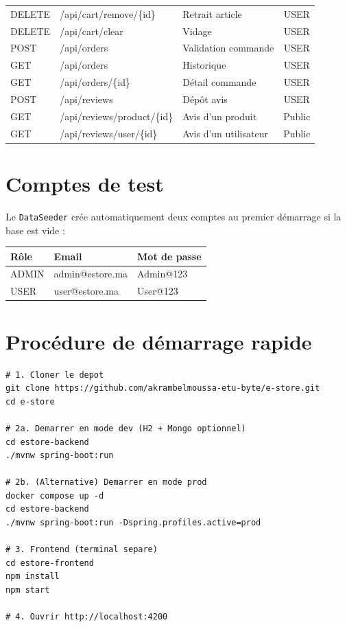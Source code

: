 \documentclass[11pt,a4paper,oneside]{report}
\begin{document}
\begin{longtable}{p{1.2cm}p{4.5cm}p{6cm}c}
DELETE & /api/cart/remove/\{id\}& Retrait article              & USER \\
DELETE & /api/cart/clear        & Vidage                       & USER \\
POST   & /api/orders            & Validation commande          & USER \\
GET    & /api/orders            & Historique                   & USER \\
GET    & /api/orders/\{id\}     & Détail commande              & USER \\
POST   & /api/reviews           & Dépôt avis                   & USER \\
GET    & /api/reviews/product/\{id\} & Avis d'un produit        & Public \\
GET    & /api/reviews/user/\{id\} & Avis d'un utilisateur       & Public \\
\bottomrule
\end{longtable}

\chapter{Comptes de test}

Le \texttt{DataSeeder} crée automatiquement deux comptes au premier
démarrage si la base est vide :

\begin{table}[htbp]
\centering
\small
\begin{tabular}{lll}
\toprule
\textbf{Rôle} & \textbf{Email} & \textbf{Mot de passe}\\
\midrule
ADMIN & admin@estore.ma & Admin@123 \\
USER  & user@estore.ma  & User@123  \\
\bottomrule
\end{tabular}
\end{table}

\chapter{Procédure de démarrage rapide}

\begin{lstlisting}[style=shellstyle]
# 1. Cloner le depot
git clone https://github.com/akrambelmoussa-etu-byte/e-store.git
cd e-store

# 2a. Demarrer en mode dev (H2 + Mongo optionnel)
cd estore-backend
./mvnw spring-boot:run

# 2b. (Alternative) Demarrer en mode prod
docker compose up -d
cd estore-backend
./mvnw spring-boot:run -Dspring.profiles.active=prod

# 3. Frontend (terminal separe)
cd estore-frontend
npm install
npm start

# 4. Ouvrir http://localhost:4200
\end{lstlisting}
\end{document}

